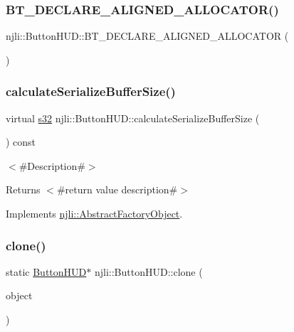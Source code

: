 \subsubsection{\texorpdfstring{B\+T\+\_\+\+D\+E\+C\+L\+A\+R\+E\+\_\+\+A\+L\+I\+G\+N\+E\+D\+\_\+\+A\+L\+L\+O\+C\+A\+T\+O\+R()}{BT\_DECLARE\_ALIGNED\_ALLOCATOR()}}
{\footnotesize\ttfamily njli\+::\+Button\+H\+U\+D\+::\+B\+T\+\_\+\+D\+E\+C\+L\+A\+R\+E\+\_\+\+A\+L\+I\+G\+N\+E\+D\+\_\+\+A\+L\+L\+O\+C\+A\+T\+OR (\begin{DoxyParamCaption}{ }\end{DoxyParamCaption})\hspace{0.3cm}{\ttfamily [protected]}}

\mbox{\label{classnjli_1_1_button_h_u_d_a72a6b396ec221a2b33cc14217c936d0b}} 
\subsubsection{\texorpdfstring{calculate\+Serialize\+Buffer\+Size()}{calculateSerializeBufferSize()}}
{\footnotesize\ttfamily virtual \mbox{\hyperlink{_util_8h_aa62c75d314a0d1f37f79c4b73b2292e2}{s32}} njli\+::\+Button\+H\+U\+D\+::calculate\+Serialize\+Buffer\+Size (\begin{DoxyParamCaption}{ }\end{DoxyParamCaption}) const\hspace{0.3cm}{\ttfamily [virtual]}}

$<$\#\+Description\#$>$

\begin{DoxyReturn}{Returns}
$<$\#return value description\#$>$ 
\end{DoxyReturn}


Implements \mbox{\hyperlink{classnjli_1_1_abstract_factory_object_a4763d05bc9dc37c559111f8bb30e1dd8}{njli\+::\+Abstract\+Factory\+Object}}.

\mbox{\label{classnjli_1_1_button_h_u_d_a9ba2fb86b1b725d947ddb21d338ef1cf}} 
\subsubsection{\texorpdfstring{clone()}{clone()}}
{\footnotesize\ttfamily static \mbox{\hyperlink{classnjli_1_1_button_h_u_d}{Button\+H\+UD}}$\ast$ njli\+::\+Button\+H\+U\+D\+::clone (\begin{DoxyParamCaption}\item[{const \mbox{\hyperlink{classnjli_1_1_button_h_u_d}{Button\+H\+UD}} \&}]{object }\end{DoxyParamCaption})\hspace{0.3cm}{\ttfamily [static]}}

